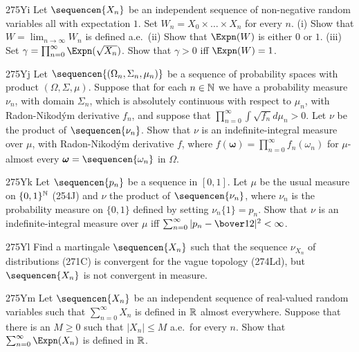 {\spheader 275Yi Let $\sequencen{X_n}$ be an independent sequence of
non-negative random variables all with expectation $1$.   Set
$W_n=X_0\times\ldots\times X_n$ for every $n$.   (i) Show that
$W=\lim_{n\to\infty}W_n$ is defined a.e.\   (ii) Show that $\Expn(W)$ is
either $0$ or $1$.      (iii) Set
$\gamma=\prod_{n=0}^{\infty}\Expn(\sqrt{X_n})$.   Show that $\gamma>0$
iff $\Expn(W)=1$.

\spheader 275Yj Let $\sequencen{(\Omega_n,\Sigma_n,\mu_n)}$ be a
sequence of probability spaces with product $(\Omega,\Sigma,\mu)$.
Suppose that
for each $n\in\Bbb N$ we have a probability measure $\nu_n$, with domain
$\Sigma_n$, which is absolutely continuous with respect to $\mu_n$, with
Radon-Nikod\'ym derivative $f_n$, and suppose that
$\prod_{n=0}^{\infty}\int\sqrt{f_n}d\mu_n>0$.   Let $\nu$ be the product of $\sequencen{\nu_n}$.   Show that $\nu$ is an
indefinite-integral measure over $\mu$, with Radon-Nikod\'ym derivative
$f$, where $f(\pmb{\omega})=\prod_{n=0}^{\infty}f_n(\omega_n)$ for
$\mu$-almost every $\pmb{\omega}=\sequencen{\omega_n}$ in $\Omega$.

\spheader 275Yk Let $\sequencen{p_n}$ be a sequence in $[0,1]$.  Let
$\mu$ be the usual measure on $\{0,1\}^{\Bbb N}$ (254J) and $\nu$ the
product of $\sequencen{\nu_n}$, where $\nu_n$ is the probability measure
on $\{0,1\}$ defined by setting $\nu_n\{1\}=p_n$.   Show that $\nu$ is
an indefinite-integral measure over $\mu$ iff
$\sum_{n=0}^{\infty}|p_n-\bover12|^2<\infty$.

\spheader 275Yl
Find a martingale $\sequencen{X_n}$ such that the
sequence $\nu_{X_n}$ of distributions (271C) is convergent for the vague
topology (274Ld), but $\sequencen{X_n}$ is not convergent in measure.

\spheader 275Ym Let $\sequencen{X_n}$ be an independent sequence of
real-valued random variables such that $\sum_{n=0}^{\infty}X_n$ is defined
in $\Bbb R$ almost everywhere.   Suppose that there is an $M\ge 0$ such
that $|X_n|\le M$ a.e.\ for every $n$.   Show that
$\sum_{n=0}^{\infty}\Expn(X_n)$ is defined in $\Bbb R$.

}
